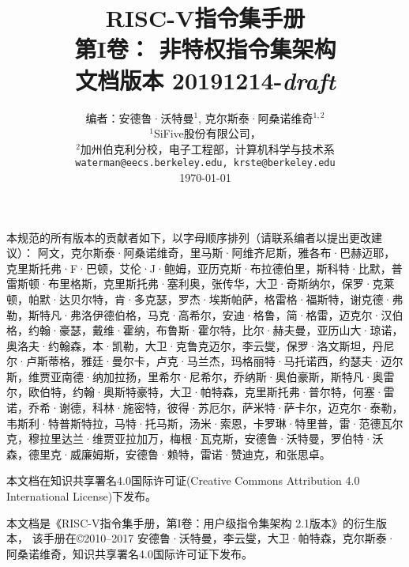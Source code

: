 \documentclass[twoside,11pt]{book}
\newcommand{\specrev}{\mbox{20191214-{\em draft}}}
\newcommand{\specmonthyear}{\mbox{December 2019}}
\begin{document}
\title{\vspace{-0.7in}\Large {\bf RISC-V指令集手册} \\
  \large {\bf 第I卷： 非特权指令集架构} \\
  文档版本 \specrev
  \vspace{-0.1in}}

\author{编者：安德鲁·沃特曼$^{1}$, 克尔斯泰·阿桑诺维奇$^{1,2}$ \\
  $^{1}$SiFive股份有限公司， \\
  $^{2}$加州伯克利分校，电子工程部，计算机科学与技术系\\
  {\tt waterman@eecs.berkeley.edu, krste@berkeley.edu} \\
  \today
}
\date{} 
\maketitle


\setlength{\parindent}{2em}

本规范的所有版本的贡献者如下，以字母顺序排列（请联系编者以提出更改建议）：
阿文，克尔斯泰·阿桑诺维奇，里马斯·阿维齐尼斯，雅各布·巴赫迈耶，克里斯托弗·F·巴顿，艾伦·J·鲍姆，亚历克斯·布拉德伯里，斯科特·比默，普雷斯顿·布里格斯，克里斯托弗·塞利奥，张传华，大卫·奇斯纳尔，保罗·克莱顿，帕默·达贝尔特，肯·多克瑟，罗杰·埃斯帕萨，格雷格·福斯特，谢克德·弗勒，斯特凡·弗洛伊德伯格，马克·高希尔，安迪·格鲁，简·格雷，迈克尔·汉伯格，约翰·豪瑟，戴维·霍纳，布鲁斯·霍尔特，比尔·赫夫曼，亚历山大·琼诺，奥洛夫·约翰森，本·凯勒，大卫·克鲁克迈尔，李云燮，保罗·洛文斯坦，丹尼尔·卢斯蒂格，雅廷·曼尔卡，卢克·马兰杰，玛格丽特·马托诺西，约瑟夫·迈尔斯，维贾亚南德·纳加拉扬，里希尔·尼希尔，乔纳斯·奥伯豪斯，斯特凡·奥雷尔，欧伯特，约翰·奥斯特豪特，大卫·帕特森，克里斯托弗·普尔特，何塞·雷诺，乔希·谢德，科林·施密特，彼得·苏厄尔，萨米特·萨卡尔，迈克尔·泰勒，韦斯利·特普斯特拉，马特·托马斯，汤米·索恩，卡罗琳·特里普，雷·范德瓦尔克，穆拉里达兰·维贾亚拉加万，梅根·瓦克斯，安德鲁·沃特曼，罗伯特·沃森，德里克·威廉姆斯，安德鲁·赖特，雷诺·赞迪克，和张思卓。


本文档在知识共享署名4.0国际许可证(Creative Commons Attribution 4.0 International License)下发布。


本文档是《RISC-V指令集手册，第I卷：用户级指令集架构 2.1版本》的衍生版本，
该手册在\copyright 2010--2017 安德鲁·沃特曼，李云燮，大卫·帕特森，克尔斯泰·阿桑诺维奇，知识共享署名4.0国际许可证下发布。 

\end{document}

